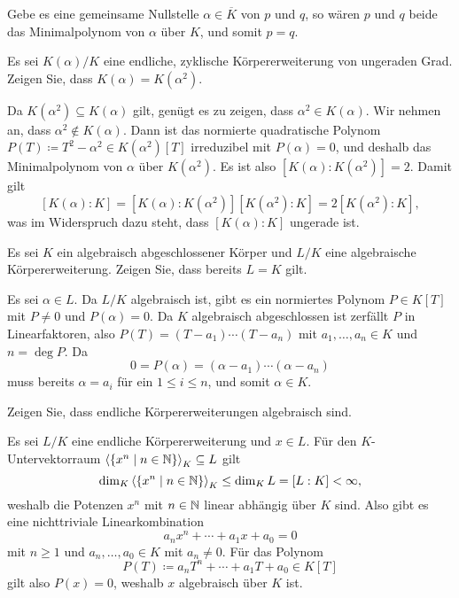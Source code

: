 \begin{solution}
  Gebe es eine gemeinsame Nullstelle $\alpha \in \overline{K}$ von $p$ und $q$, so wären $p$ und $q$ beide das Minimalpolynom von $\alpha$ über $K$, und somit $p = q$.
\end{solution}


\begin{question}
  Es sei $K(\alpha)/K$ eine endliche, zyklische Körpererweiterung von ungeraden Grad.
  Zeigen Sie, dass $K(\alpha) = K(\alpha^2)$.
\end{question}


\begin{solution}
  Da $K(\alpha^2) \subseteq K(\alpha)$ gilt, genügt es zu zeigen, dass $\alpha^2 \in K(\alpha)$.
  Wir nehmen an, dass $\alpha^2 \notin K(\alpha)$.
  Dann ist das normierte quadratische Polynom $P(T) \coloneqq T^2 - \alpha^2 \in K(\alpha^2)[T]$ irreduzibel mit $P(\alpha) = 0$, und deshalb das Minimalpolynom von $\alpha$ über $K(\alpha^2)$.
  Es ist also $[K(\alpha) : K(\alpha^2)] = 2$.
  Damit gilt
  \[
      [K(\alpha) : K]
    = [K(\alpha) : K(\alpha^2)] [K(\alpha^2) : K]
    = 2 [K(\alpha^2) : K],
  \]
  was im Widerspruch dazu steht, dass $[K(\alpha) : K]$ ungerade ist.
\end{solution}


\begin{question}
  Es sei $K$ ein algebraisch abgeschlossener Körper und $L/K$ eine algebraische Körpererweiterung.
  Zeigen Sie, dass bereits $L = K$ gilt.
\end{question}


\begin{solution}
  Es sei $\alpha \in L$.
  Da $L/K$ algebraisch ist, gibt es ein normiertes Polynom $P \in K[T]$ mit $P \neq 0$ und $P(\alpha) = 0$.
  Da $K$ algebraisch abgeschlossen ist zerfällt $P$ in Linearfaktoren, also $P(T) = (T - a_1) \dotsm (T - a_n)$ mit $a_1, \dotsc, a_n \in K$ und $n = \deg P$.
  Da
  \[
      0
    = P(\alpha)
    = (\alpha - a_1) \dotsm (\alpha - a_n)
  \]
  muss bereits $\alpha = a_i$ für ein $1 \leq i \leq n$, und somit $\alpha \in K$.
\end{solution}


\begin{question}
  \label{equation: finite extensions are algebraic}
  Zeigen Sie, dass endliche Körpererweiterungen algebraisch sind.
\end{question}


\begin{solution}
  Es sei $L/K$ eine endliche Körpererweiterung und $x \in L$.
  Für den $K$-Untervektorraum $\left\langle  \{x^n \mid n \in \mathbb{N}\}  \right\rangle_K \subseteq L$ gilt
  \[
          \dim_K \left\langle  \{x^n \mid n \in \mathbb{N} \}  \right\rangle_K
    \leq  \dim_K L
    =     [L : K]
    <     \infty,
  \]
  weshalb die Potenzen $x^n$ mit $n \in \mathbb{N}$ linear abhängig über $K$ sind.
  Also gibt es eine nichttriviale Linearkombination
  \[
    a_n x^n + \dotsb + a_1 x + a_0 = 0
  \]
  mit $n \geq 1$ und $a_n, \dotsc, a_0 \in K$ mit $a_n \neq 0$.
  Für das Polynom
  \[
              P(T)
    \coloneqq a_n T^n + \dotsb + a_1 T + a_0
    \in       K[T]
  \]
  gilt also $P(x) = 0$, weshalb $x$ algebraisch über $K$ ist.
\end{solution}


